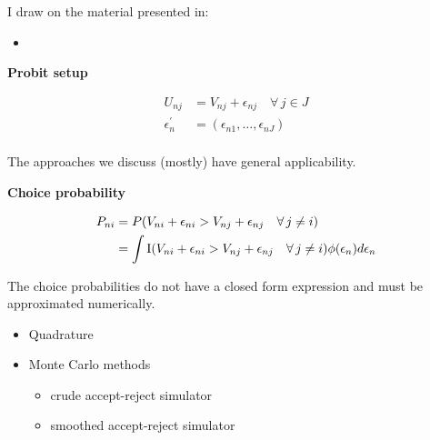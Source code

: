 \begin{frame} I draw on the material presented in:

\begin{itemize}
\item {}
\end{itemize}

\end{frame}
\begin{frame}\textbf{Probit setup}\vspace{0.3cm}

\begin{align*}
U_{nj} & = V_{nj} + \epsilon_{nj}\quad \forall\, j \in J\\
\epsilon^\prime_{n} & = (\epsilon_{n1}, \hdots, \epsilon_{nJ})\\
\end{align*}

The approaches we discuss (mostly) have general applicability.

\end{frame}
\begin{frame}\textbf{Choice probability}\vspace{0.3cm}

\begin{align*}
  P_{ni} & = P(V_{ni} + \epsilon_{ni} > V_{nj} + \epsilon_{nj} \quad \forall\, j \neq i) \\
         & = \int \mathrm{I} (V_{ni} + \epsilon_{ni} > V_{nj} + \epsilon_{nj} \quad \forall\, j \neq i) \phi(\epsilon_n)d\epsilon_n
\end{align*}

\end{frame}
\begin{frame}\vspace{0.3cm}

The choice probabilities do not have a closed form expression and must be approximated numerically.

\begin{itemize}\setlength\itemsep{1em}
  \item Quadrature
  \item Monte Carlo methods\medskip
  \begin{itemize}\setlength\itemsep{1em}
    \item crude accept-reject simulator
    \item smoothed accept-reject simulator
  \end{itemize}
\end{itemize}
\end{frame}
